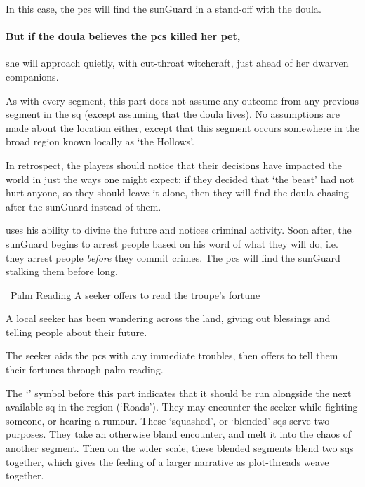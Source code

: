 \begin{multicols}{2}
In this case, the \glspl{pc} will find the \gls{sunGuard} in a stand-off with the \gls{doula}.

\paragraph{But if the \gls{doula} believes the \glspl{pc} killed her pet,}
she will approach quietly, with cut-throat \gls{witchcraft}, just ahead of her dwarven companions.

As with every \gls{segment}, this part does not assume any outcome from any previous \gls{segment} in the \gls{sq} (except assuming that the \gls{doula} lives).
No assumptions are made about the location either, except that this segment occurs somewhere in the broad region known locally as `the Hollows'.

In retrospect, the players should notice that their decisions have impacted the world in just the ways one might expect; if they decided that `the beast' had not hurt anyone, so they should leave it alone, then they will find the \gls{doula} chasing after the \gls{sunGuard} instead of them.


\noindent
{} uses his ability to divine the future and notices criminal activity.
Soon after, the \gls{sunGuard} begins to arrest people based on his word of what they will do, i.e. they arrest people \emph{before} they commit crimes.
The \glspl{pc} will find the \gls{sunGuard} stalking them before long.

{\squash~Palm Reading}%
{A \gls{seeker} offers to read the troupe's fortune}%

\begin{exampletext}
  A local \gls{seeker} has been wandering across the land, giving out blessings and telling people about their future.
\end{exampletext}

The \gls{seeker} aids the \glspl{pc} with any immediate troubles, then offers to tell them their fortunes through palm-reading.

The `\squash' symbol before this part indicates that it should be run alongside the next available \gls{sq} in the region (`Roads').
They may encounter the \gls{seeker} while fighting someone, or hearing a rumour.
These `squashed', or `blended' \glspl{sq} serve two purposes.
They take an otherwise bland encounter, and melt it into the chaos of another \gls{segment}.
Then on the wider scale, these blended \glspl{segment} blend two \glspl{sq} together, which gives the feeling of a larger narrative as plot-threads weave together.


\end{multicols}
